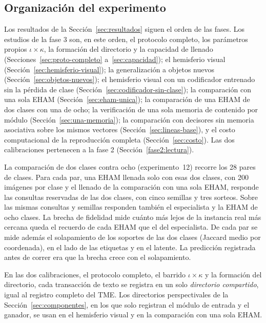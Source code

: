 \subsection{Organización del experimento}
\label{sec:organizacion}

Los resultados de la Sección~\ref{sec:resultados} siguen el orden de las fases.
Los estudios de la fase 3 son, en este orden, el protocolo completo, los parámetros
propios $\iota \times \kappa$, la formación del directorio y la capacidad de llenado
(Secciones~\ref{sec:proto-completo} a~\ref{sec:capacidad}); el hemisferio visual
(Sección~\ref{sec:hemisferio-visual}); la generalización a objetos nuevos
(Sección~\ref{sec:objetos-nuevos}); el hemisferio visual con un codificador entrenado
sin la pérdida de clase (Sección~\ref{sec:codificador-sin-clase}); la comparación con
una sola EHAM (Sección~\ref{sec:eham-unica}); la comparación de una EHAM de dos clases
con una de ocho; la verificación de una sola memoria de contenido por módulo
(Sección~\ref{sec:una-memoria}); la comparación con decisores sin memoria asociativa
sobre los mismos vectores (Sección~\ref{sec:lineas-base}), y el costo computacional de
la reproducción completa (Sección~\ref{sec:costo}).
Las dos calibraciones pertenecen a la fase 2 (Sección~\ref{fase2:lectura}).

La comparación de dos clases contra ocho (experimento~12) recorre los 28 pares de
clases.
Para cada par, una EHAM llenada solo con esas dos clases, con 200 imágenes por clase y
el llenado de la comparación con una sola EHAM, responde las consultas reservadas de
las dos clases, con cinco semillas y tres sorteos.
Sobre las mismas consultas y semillas responden también el especialista y la EHAM de
ocho clases.
La brecha de fidelidad mide cuánto más lejos de la instancia real más cercana queda el
recuerdo de cada EHAM que el del especialista.
De cada par se mide además el solapamiento de los soportes de las dos clases (Jaccard
medio por coordenada), en el lado de las etiquetas y en el latente.
La predicción registrada antes de correr era que la brecha crece con el solapamiento.

En las dos calibraciones, el protocolo completo, el barrido $\iota \times \kappa$ y la
formación del directorio, cada transacción de texto se registra en un solo
\emph{directorio compartido}, igual al registro completo del TME.
Los directorios perspectivales de la Sección~\ref{sec:componentes}, en los que solo
registran el módulo de entrada y el ganador, se usan en el hemisferio visual y en la
comparación con una sola EHAM.

